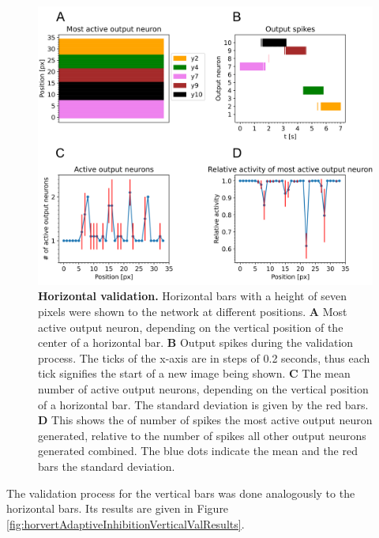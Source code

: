 \begin{figure}
  \includegraphics[width=\linewidth]{figures/horvertAdaptiveInh/horizontal_validation.png}
  \caption{\textbf{Horizontal validation.} Horizontal bars with a height of seven pixels were shown to the network at different positions. \textbf{A} Most active output neuron, depending on the vertical position of the center of a horizontal bar. \textbf{B} Output spikes during the validation process. The ticks of the x-axis are in steps of 0.2 seconds, thus each tick signifies the start of a new image being shown. \textbf{C} The mean number of active output neurons, depending on the vertical position of a horizontal bar. The standard deviation is given by the red bars. \textbf{D} This shows the of number of spikes the most active output neuron generated, relative to the number of spikes all other output neurons generated combined. The blue dots indicate the mean and the red bars the standard deviation. }
  \label{fig:horvertAdaptiveInhibitionHorizontalValResults}
\end{figure}

The validation process for the vertical bars was done analogously to the horizontal bars. Its results are given in Figure \ref{fig:horvertAdaptiveInhibitionVerticalValResults}. 
 
